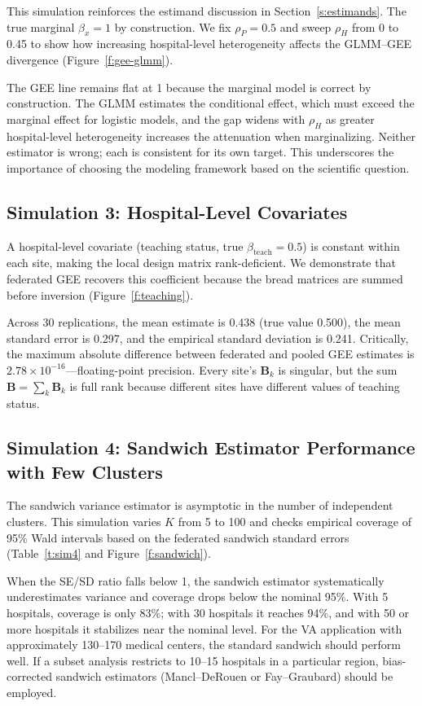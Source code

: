 \documentclass[useAMS,referee]{biom}
\begin{document}
This simulation reinforces the estimand discussion in Section~\ref{s:estimands}. The true marginal $\beta_x = 1$ by construction. We fix $\rho_P = 0.5$ and sweep $\rho_H$ from 0 to 0.45 to show how increasing hospital-level heterogeneity affects the GLMM--GEE divergence (Figure~\ref{f:gee-glmm}).

The GEE line remains flat at 1 because the marginal model is correct by construction. The GLMM estimates the conditional effect, which must exceed the marginal effect for logistic models, and the gap widens with $\rho_H$ as greater hospital-level heterogeneity increases the attenuation when marginalizing. Neither estimator is wrong; each is consistent for its own target. This underscores the importance of choosing the modeling framework based on the scientific question.


\subsection{Simulation 3: Hospital-Level Covariates}
\label{s:sim3}

A hospital-level covariate (teaching status, true $\beta_{\text{teach}} = 0.5$) is constant within each site, making the local design matrix rank-deficient. We demonstrate that federated GEE recovers this coefficient because the bread matrices are summed before inversion (Figure~\ref{f:teaching}).

Across 30 replications, the mean estimate is 0.438 (true value 0.500), the mean standard error is 0.297, and the empirical standard deviation is 0.241. Critically, the maximum absolute difference between federated and pooled GEE estimates is $2.78 \times 10^{-16}$---floating-point precision. Every site's $\mathbf{B}_k$ is singular, but the sum $\mathbf{B} = \sum_k \mathbf{B}_k$ is full rank because different sites have different values of teaching status.


\subsection{Simulation 4: Sandwich Estimator Performance with Few Clusters}
\label{s:sim4}

The sandwich variance estimator is asymptotic in the number of independent clusters. This simulation varies $K$ from 5 to 100 and checks empirical coverage of 95\% Wald intervals based on the federated sandwich standard errors (Table~\ref{t:sim4} and Figure~\ref{f:sandwich}).

When the SE/SD ratio falls below 1, the sandwich estimator systematically underestimates variance and coverage drops below the nominal 95\%. With 5 hospitals, coverage is only 83\%; with 30 hospitals it reaches 94\%, and with 50 or more hospitals it stabilizes near the nominal level. For the VA application with approximately 130--170 medical centers, the standard sandwich should perform well. If a subset analysis restricts to 10--15 hospitals in a particular region, bias-corrected sandwich estimators (Mancl--DeRouen or Fay--Graubard) should be employed.
\end{document}
